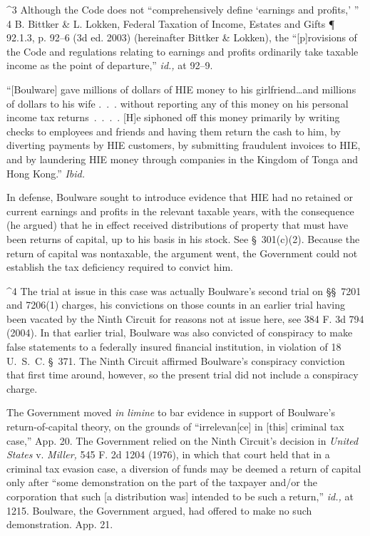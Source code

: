 ^3 Although the Code does not ``comprehensively define ‘earnings and
profits,' '' 4 B. Bittker \& L. Lokken, Federal Taxation of Income,
Estates and Gifts ¶ 92.1.3, p. 92--6 (3d ed. 2003) (hereinafter
Bittker \& Lokken), the ``[p]rovisions of the Code and regulations
relating to earnings and profits ordinarily take taxable income as the
point of departure,'' \emph{id.,} at 92--9.


    ``[Boulware] gave millions of dollars of HIE money to his
    girlfriend\dots and millions of dollars to his wife .~.~.
    without reporting any of this money on his personal income tax
    returns~.~.~.~. [H]e siphoned off this money primarily by
    writing checks to employees and friends and having them return the
    cash to him, by diverting payments by HIE customers, by submitting
    fraudulent invoices to HIE, and by laundering HIE money through
    companies in the Kingdom of Tonga and Hong Kong.'' \emph{Ibid.}

\noindent In defense, Boulware sought to introduce evidence that HIE had no
retained or current earnings and profits in the relevant taxable
years, with the consequence (he argued) that he in effect received
distributions of property that must have been returns of capital, up to
his basis in his stock. See \S~301(c)(2). Because the return of capital
was nontaxable, the argument went, the Government could not establish
the tax deficiency required to convict him. \newpage 

^4 The trial at issue in this case was actually Boulware's second
trial on \S\S~7201 and 7206(1) charges, his convictions on those counts
in an earlier trial having been vacated by the Ninth Circuit for reasons
not at issue here, see 384 F. 3d 794 (2004). In that earlier trial,
Boulware was also convicted of conspiracy to make false statements to a
federally insured financial institution, in violation of 18 U.~S.~C.
\S~371. The Ninth Circuit affirmed Boulware's conspiracy conviction
that first time around, however, so the present trial did not include a
conspiracy charge.

  The Government moved \emph{in limine} to bar evidence in support
of Boulware's return-of-capital theory, on the grounds of
``irrelevan[ce] in [this] criminal tax case,'' App. 20. The Government
relied on the Ninth Circuit's decision in \emph{United States} v.
\emph{Miller,} 545 F. 2d 1204 (1976), in which that court held that in a
criminal tax evasion case, a diversion of funds may be deemed a return
of capital only after ``some demonstration on the part of the taxpayer
and/or the corporation that such [a distribution was] intended to be
such a return,'' \emph{id.,} at 1215. Boulware, the Government argued,
had offered to make no such demonstration. App. 21.

